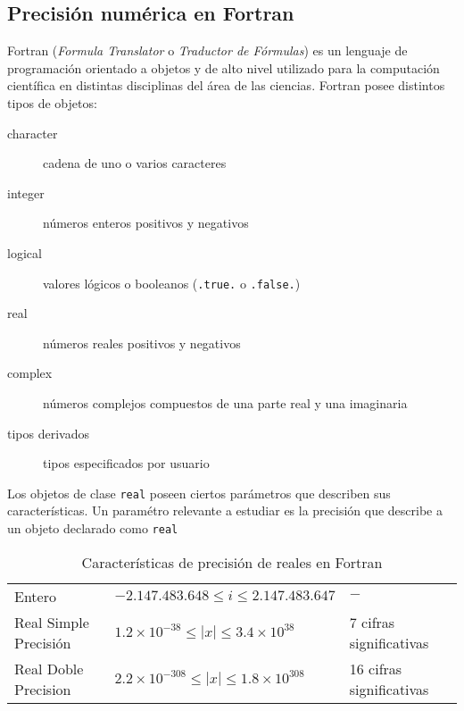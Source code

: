 

\subsection{Precisión numérica en Fortran}
Fortran (\textit{Formula Translator} o \textit{Traductor de Fórmulas}) es un lenguaje de programación orientado a objetos y de alto nivel utilizado para la computación científica en distintas disciplinas del área de las ciencias. Fortran posee distintos tipos de objetos:

\begin{description}
\item [character] cadena de uno o varios caracteres \vspace{-0,2cm}
\item [integer] números enteros positivos y negativos \vspace{-0,2cm}
\item [logical] valores lógicos o booleanos (\texttt{.true.} o \texttt{.false.})\vspace{-0,2cm}
\item [real] números reales positivos y negativos  \vspace{-0,2cm}
\item [complex] números complejos compuestos de una parte real y una imaginaria \vspace{-0,2cm}
\item [tipos derivados] tipos especificados por usuario
\end{description}

Los objetos de clase \texttt{real} poseen ciertos parámetros que describen sus características. Un paramétro relevante a estudiar es la precisión que describe a un objeto declarado como \texttt{real}

\begin{center}
\begin{table} [H]
\begin{tabular}{lll}
Entero & $−2.147.483.648 \leq i \leq 2.147.483.647$ & $-$ \\
Real Simple Precisión & $1.2 \times 10^{−38} \leq |x| \leq 3.4 \times 10^{38}$  & 7 cifras significativas\\
Real Doble Precision & $2.2 \times 10^{−308} \leq |x| \leq 1.8 \times 10^{308}$ & 16 cifras significativas
\end{tabular}
\caption{Características de precisión de reales en Fortran} \label{TABLA_FORTRAN}
\end{table}
\end{center}

